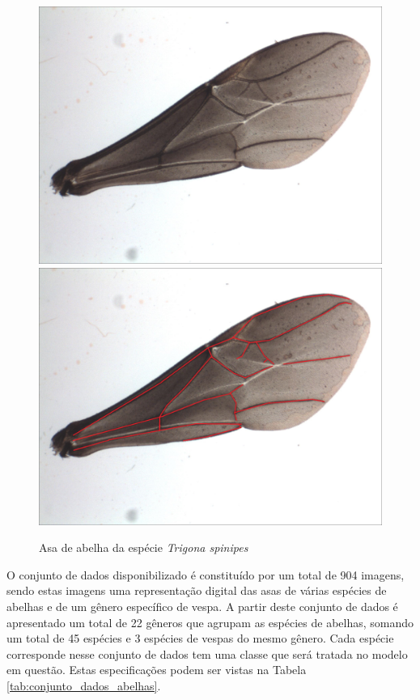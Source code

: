 \documentclass[
	12pt,				%
	oneside,			%
	a4paper,			%
	english,			%
	brazil				%
	]{abntex2ppgsi}
\begin{document}
\begin{figure}[H]
    \centering
    \caption{Asa de abelha da espécie \textit{Trigona spinipes}}
    \includegraphics[width=.45\textwidth]{imagens/materiais_metodos/02_mel_trigona_spinipes.jpg}\hfill
    \includegraphics[width=.45\textwidth]{imagens/materiais_metodos/02_mel_trigona_spinipes_mapped.jpg}
    \label{fig:02_mel_trigona_spinipes}
\end{figure}

O conjunto de dados disponibilizado é constituído por um total de 904 imagens, sendo estas imagens uma representação digital das asas de várias espécies de abelhas e de um gênero específico de vespa. A partir deste conjunto de dados é apresentado um total de 22 gêneros que agrupam as espécies de abelhas, somando um total de 45 espécies e 3 espécies de vespas do mesmo gênero. Cada espécie corresponde nesse conjunto de dados tem uma classe que será tratada no modelo em questão. Estas especificações podem ser vistas na Tabela \ref{tab:conjunto_dados_abelhas}.
\end{document}
